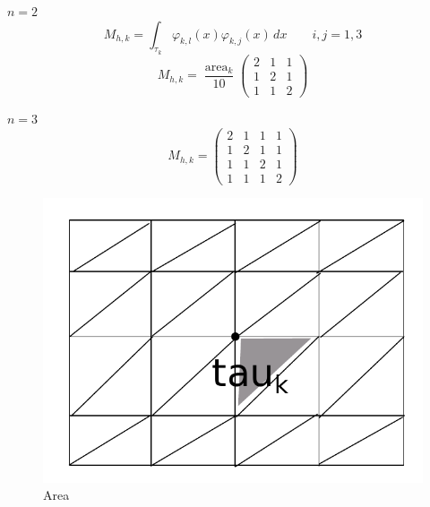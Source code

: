 \documentclass{article}
\begin{document}
$n=2$
\[ M_{h,k} = \int_{\tau_k} \varphi_{k,l}(x) \varphi_{k,j}(x) \, dx \qquad i,j = 1,3 \]
\[ M_{h,k} = \frac{\operatorname{area}_k}{10} \begin{pmatrix} 2 & 1 & 1 \\ 1 & 2 & 1 \\ 1 & 1 & 2 \end{pmatrix} \]

$n=3$
\[ M_{h,k} = \begin{pmatrix} 2 & 1 & 1 & 1 \\ 1 & 2 & 1 & 1 \\ 1 & 1 & 2 & 1 \\ 1 & 1 & 1 & 2 \end{pmatrix} \]

\begin{figure}[h]
  \begin{center}
    \includegraphics{img/05_area.pdf}
    \caption{Area}
  \end{center}
\end{figure}
\end{document}
